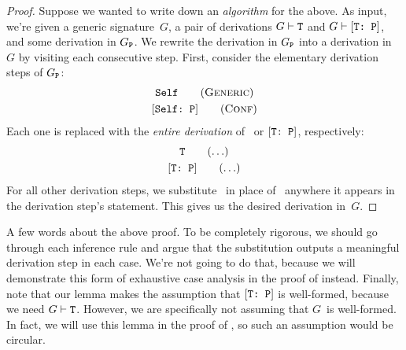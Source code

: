 \documentclass[../generics]{subfiles}
\begin{document}
\begin{proof}
Suppose we wanted to write down an \emph{algorithm} for the above. As input, we're given a generic signature~$G$, a pair of derivations $G\vdash\texttt{T}$ and $G\vdash[\texttt{T:~P}]$, and some derivation in $G_{\texttt{P}}$. We rewrite the derivation in $G_{\texttt{P}}$ into a derivation in $G$ by visiting each consecutive step. First, consider the elementary derivation steps of $G_{\texttt{P}}$:
\begin{gather*}
\tSelf\tag{\textsc{Generic}}\\
\ConfReq{Self}{P}\tag{\textsc{Conf}}
\end{gather*}
Each one is replaced with the \emph{entire derivation} of \tT\ or $[\texttt{T:~P}]$, respectively:
\begin{gather*}
\tT\tag{$\ldots$}\\
\TP\tag{$\ldots$}
\end{gather*}
For all other derivation steps, we substitute \tT\ in place of \tSelf\ anywhere it appears in the derivation step's statement. This gives us the desired derivation in~$G$.
\end{proof}
A few words about the above proof. To be completely rigorous, we should go through each inference rule and argue that the substitution outputs a meaningful derivation step in each case. We're not going to do that, because we will demonstrate this form of exhaustive case analysis in the proof of  instead. Finally, note that our lemma makes the assumption that $[\texttt{T:~P}]$ is well-formed, because we need $G\vdash\texttt{T}$. However, we are specifically not assuming that $G$~is well-formed. In fact, we will use this lemma in the proof of , so such an assumption would be circular.
\end{document}
